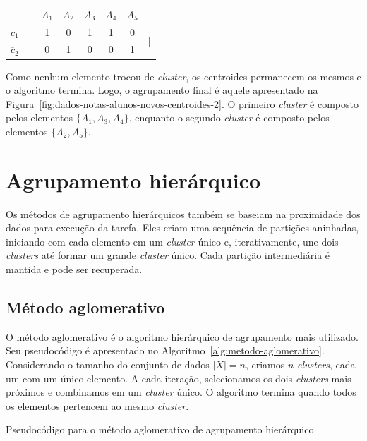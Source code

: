 \begin{center}
	\begin{tabular}{cccccccc}
		& & $A_1$ & $A_2$ & $A_3$ & $A_4$ & $A_5$ & \\
		$\overline{c}_1$ & \multirow{2}{*}{$\Bigg[$} & 1 & 0 & 1 & 1 & 0 & \multirow{2}{*}{$\Bigg]$} \\
		\multicolumn{1}{l}{$\overline{c}_2$} & & 0 & 1 & 0 & 0 & 1 & 
	\end{tabular}
\end{center}

\insertspace

Como nenhum elemento trocou de \textit{cluster}, os centroides permanecem os mesmos e o algoritmo termina. Logo, o agrupamento final é aquele apresentado na Figura~\ref{fig:dados-notas-alunos-novos-centroides-2}. O primeiro \textit{cluster} é composto pelos elementos $\{A_1, A_3, A_4\}$, enquanto o segundo \textit{cluster} é composto pelos elementos $\{A_2, A_5\}$.

\section{Agrupamento hierárquico}

Os métodos de agrupamento hierárquicos também se baseiam na proximidade dos dados para execução da tarefa. Eles criam uma sequência de partições aninhadas, iniciando com cada elemento em um \textit{cluster} único e, iterativamente, une dois \textit{clusters} até formar um grande \textit{cluster} único. Cada partição intermediária é mantida e pode ser recuperada.

\subsection{Método aglomerativo}

O método aglomerativo é o algoritmo hierárquico de agrupamento mais utilizado. Seu pseudocódigo é apresentado no Algoritmo~\ref{alg:metodo-aglomerativo}. Considerando o tamanho do conjunto de dados $|X| = n$, criamos $n$ \textit{clusters}, cada um com um único elemento. A cada iteração, selecionamos os dois \textit{clusters} mais próximos e combinamos em um \textit{cluster} único. O algoritmo termina quando todos os elementos pertencem ao mesmo \textit{cluster}.

\begin{algorithm}[h]
	\DontPrintSemicolon
	
	
	\caption{Pseudocódigo para o método aglomerativo de agrupamento hierárquico}
	\label{alg:metodo-aglomerativo}
\end{algorithm}

